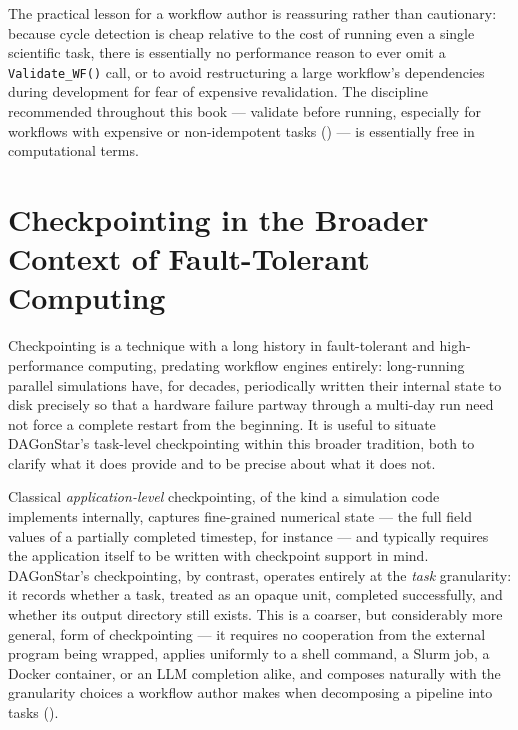\begin{practicebox}
The practical lesson for a workflow author is reassuring rather than
cautionary: because cycle detection is cheap relative to the cost of running
even a single scientific task, there is essentially no performance reason to
ever omit a \texttt{Validate\_WF()} call, or to avoid restructuring a large
workflow's dependencies during development for fear of expensive
revalidation. The discipline recommended throughout this book --- validate
before running, especially for workflows with expensive or non-idempotent
tasks () --- is essentially free in computational
terms.
\end{practicebox}

\section{Checkpointing in the Broader Context of Fault-Tolerant Computing}

Checkpointing is a technique with a long history in fault-tolerant and
high-performance computing, predating workflow engines entirely: long-running
parallel simulations have, for decades, periodically written their internal
state to disk precisely so that a hardware failure partway through a
multi-day run need not force a complete restart from the beginning. It is
useful to situate DAGonStar's task-level checkpointing within this broader
tradition, both to clarify what it does provide and to be precise about
what it does not.

Classical \emph{application-level} checkpointing, of the kind a simulation
code implements internally, captures fine-grained numerical state --- the
full field values of a partially completed timestep, for instance --- and
typically requires the application itself to be written with checkpoint
support in mind. DAGonStar's checkpointing, by contrast, operates entirely
at the \emph{task} granularity: it records whether a task, treated as an
opaque unit, completed successfully, and whether its output directory still
exists. This is a coarser, but considerably more general, form of
checkpointing --- it requires no cooperation from the external program being
wrapped, applies uniformly to a shell command, a Slurm job, a Docker
container, or an LLM completion alike, and composes naturally with the
granularity choices a workflow author makes when decomposing a pipeline
into tasks ().

